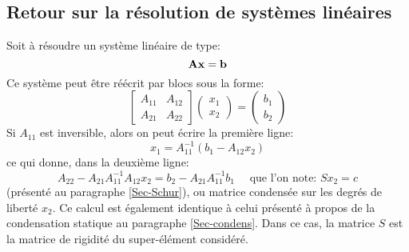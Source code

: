    \subsection{Retour sur la résolution de systèmes linéaires}
\fi
Soit à résoudre un système linéaire de type:
\begin{equation}\label{Eq-lin} \mathbf{A}\mathbf{x}=\mathbf{b} \end{equation}
Ce système peut être réécrit par blocs sous la forme:
\begin{equation} 
\begin{bmatrix} A_{11} & A_{12}\\ A_{21} & A_{22} \end{bmatrix}
\begin{pmatrix} x_1 \\ x_2 \end{pmatrix} =
\begin{pmatrix} b_1\\ b_2 \end{pmatrix} 
\end{equation}
\medskipvm
Si $A_{11}$ est inversible, alors on peut écrire la première ligne:
\begin{equation}
x_1 = A_{11}^{-1}\left( b_1-A_{12}x_2 \right)
\end{equation}
ce qui donne, dans la deuxième ligne:
\begin{equation}
A_{22} - A_{21}A_{11}^{-1}A_{12}x_2 = b_2 - A_{21}A_{11}^{-1}b_1
\quad \text{ que l'on note: }
S x_2=c
\end{equation}
(présenté au paragraphe \ref{Sec-Schur}), ou matrice condensée sur les degrés de liberté $x_2$.
Ce calcul est également identique à celui présenté à propos de la condensation statique au paragraphe \ref{Sec-condens}.
Dans ce cas, la matrice $S$ est la matrice de rigidité du super-élément considéré.

